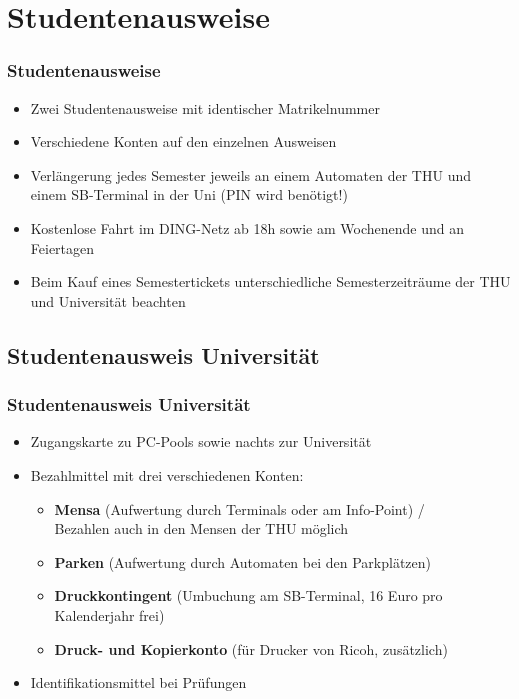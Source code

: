 \documentclass[10pt,a4paper]{beamer}
\begin{document}
    \section{Studentenausweise}
    \begin{frame}
        \frametitle{Studentenausweise}
        \begin{itemize}
            \setlength{\itemsep}{10pt} %
            \item Zwei Studentenausweise mit identischer Matrikelnummer
            \item Verschiedene Konten auf den einzelnen Ausweisen
            \item Verlängerung jedes Semester jeweils an einem Automaten der THU und einem SB-Terminal in der Uni (PIN wird benötigt!)
            \item Kostenlose Fahrt im DING-Netz ab 18h sowie am Wochenende und an Feiertagen
            \item Beim Kauf eines Semestertickets unterschiedliche Semesterzeiträume der THU und Universität beachten
        \end{itemize}
    \end{frame}

    \subsection*{Studentenausweis Universität}
    \begin{frame}
        \frametitle{Studentenausweis Universität}
        \begin{itemize}
            \setlength{\itemsep}{10pt} %
            \item Zugangskarte zu PC-Pools sowie nachts zur Universität
            \item Bezahlmittel mit drei verschiedenen Konten:
            \begin{itemize}
                \setlength{\itemsep}{10pt} %
                \item \textbf{Mensa} (Aufwertung durch Terminals oder am Info-Point) / \\ Bezahlen auch in den Mensen der THU möglich
                \item \textbf{Parken} (Aufwertung durch Automaten bei den Parkplätzen)
                \item \textbf{Druckkontingent} (Umbuchung am SB-Terminal, 16 Euro pro Kalenderjahr frei)
                \item \textbf{Druck- und Kopierkonto} (für Drucker von Ricoh, zusätzlich)
            \end{itemize}
            \item Identifikationsmittel bei Prüfungen
        \end{itemize}
    \end{frame}
\end{document}
